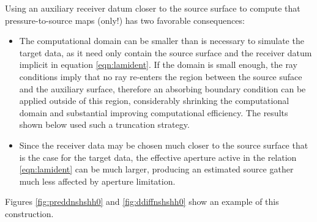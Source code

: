 \documentclass[12pt]{geophysics}
\begin{document}
Using an auxiliary receiver datum closer to the source surface to
compute that pressure-to-source maps (only!) has two favorable consequences:
\begin{itemize}
\item The computational domain can be smaller than is necessary to
  simulate the target data, as it need only contain the source
  surface and the receiver datum implicit in
  equation \ref{eqn:lamident}. If the domain is small enough, the ray
  conditions imply that no ray re-enters the region between the source
  suface and the auxiliary surface, therefore an absorbing boundary
  condition can be applied outside of this region, considerably
  shrinking the computational domain and substantial improving computational
  efficiency. The results shown below used such a truncation strategy.
\item Since the receiver data may be chosen much closer to the
  source surface that is the case for the target data, the effective
  aperture active in the relation \ref{eqn:lamident} can be much
  larger, producing an estimated source gather much less affected by
  aperture limitation.
\end{itemize}

Figures
\ref{fig:preddnshshh0} and \ref{fig:ddiffnshshh0} show an example of
this construction.
\end{document}
